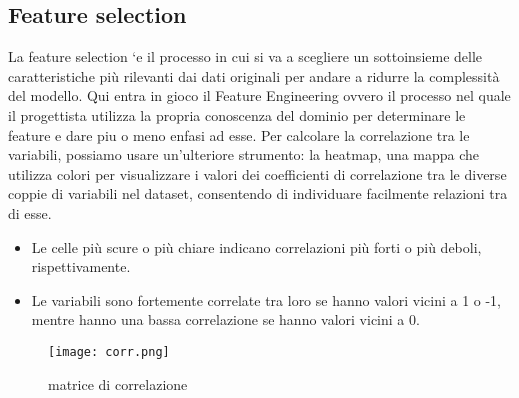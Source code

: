 \documentclass{article}
\begin{document}
\subsection{Feature selection}
La feature selection `e il processo in cui si va a scegliere un sottoinsieme delle caratteristiche più
rilevanti dai dati originali per andare a ridurre la complessità del modello. Qui entra in gioco il
Feature Engineering ovvero il processo nel quale il progettista utilizza la propria conoscenza del
dominio per determinare le feature e dare piu o meno enfasi ad esse.
\newpage
Per calcolare la correlazione tra le variabili, possiamo usare un’ulteriore strumento: la heatmap,
una mappa che utilizza colori per visualizzare i valori dei coefficienti di correlazione tra le diverse
coppie di variabili nel dataset, consentendo di individuare facilmente relazioni tra di esse.
\begin{itemize}
    \item Le celle più scure o più chiare indicano correlazioni più forti o più deboli, rispettivamente.
    \item Le variabili sono fortemente correlate tra loro se hanno valori vicini a 1 o -1, mentre hanno una bassa correlazione se hanno valori vicini a 0.
\end{itemize}
\begin{figure}
    \centering
    \texttt{[image: corr.png]}
    \caption{matrice di correlazione}
    \label{fig:enter-label}
\end{figure}
\end{document}
